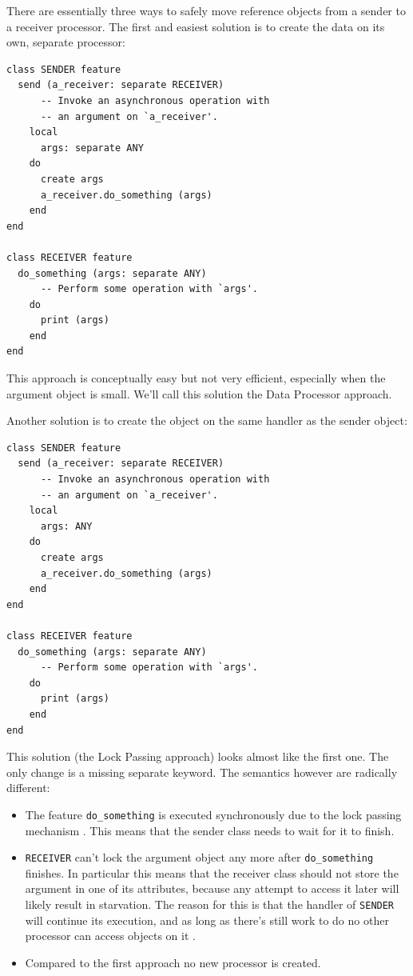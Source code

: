 \documentclass[a4paper,10pt,titlepage]{article}
\begin{document}
There are essentially three ways to safely move reference objects from a sender to a receiver processor.
The first and easiest solution is to create the data on its own, separate processor: 
\begin{lstlisting}[language=OOSC2Eiffel, captionpos=b, caption={Migrate objects on a separate processor.}]
class SENDER feature
  send (a_receiver: separate RECEIVER)
      -- Invoke an asynchronous operation with
      -- an argument on `a_receiver'.
    local
      args: separate ANY
    do
      create args
      a_receiver.do_something (args)
    end
end

class RECEIVER feature 
  do_something (args: separate ANY)
      -- Perform some operation with `args'.
    do
      print (args)
    end
end
\end{lstlisting}
This approach is conceptually easy but not very efficient, especially when the argument object is small.
We'll call this solution the Data Processor approach.

Another solution is to create the object on the same handler as the sender object:
\begin{lstlisting}[language=OOSC2Eiffel, captionpos=b, caption={Migrate objects with lock passing.}]
class SENDER feature
  send (a_receiver: separate RECEIVER)
      -- Invoke an asynchronous operation with
      -- an argument on `a_receiver'.
    local
      args: ANY
    do
      create args
      a_receiver.do_something (args)
    end
end

class RECEIVER feature 
  do_something (args: separate ANY)
      -- Perform some operation with `args'.
    do
      print (args)
    end
end
\end{lstlisting}
This solution (the Lock Passing approach) looks almost like the first one.
The only change is a missing separate keyword.
The semantics however are radically different:

\begin{itemize}
 \item The feature \lstinline!do_something! is executed synchronously due to the lock passing mechanism \cite[p. 152]{Nienaltowski07}\cite{web:scoop}.
 This means that the sender class needs to wait for it to finish.
 \item \lstinline!RECEIVER! can't lock the argument object any more after \lstinline!do_something! finishes.
 In particular this means that the receiver class should not store the argument in one of its attributes, because any attempt to access it later will likely result in starvation.
 The reason for this is that the handler of \lstinline!SENDER! will continue its execution, and as long as there's still work to do no other processor can access objects on it .
 \item Compared to the first approach no new processor is created.
\end{itemize}
\end{document}
